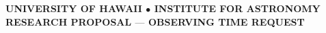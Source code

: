 \documentclass[letterpaper,11pt]{article}
\begin{document}
\pagestyle{plain}

\begin{center} 
\bfseries\uppercase{\Large{University of Hawaii $\bullet$ Institute for Astronomy} \\ 
\large{Research Proposal $—$ Observing Time Request}}
\end{center}
\vspace{-0.3cm}


\iffalse
	\noindent\fbox{\linespread{1.5}
		\parbox{\textwidth}{\bf{
				Names: {Daichi Hiramatsu} \& {Corey Mutnik} \\
				E-mails: dhiramat@hawaii.edu \& cmutnik@hawaii.edu\\
				Institution/Dept: UH
			}
		}
	} 
	~\\ %
	\noindent\fbox{\linespread{1.5}
		\parbox{\textwidth}{\bf{
				Program Title\\
				A. Measuring the Milky Way\\
				B.\\
				C.
			}
		}
	} 
\fi
\end{document}
